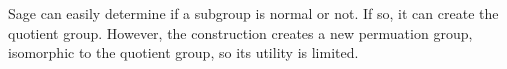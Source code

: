 Sage can easily determine if a subgroup is normal or not.  If so, it can create the quotient group.  However, the construction creates a new permuation group, isomorphic to the quotient group, so its utility is limited.
